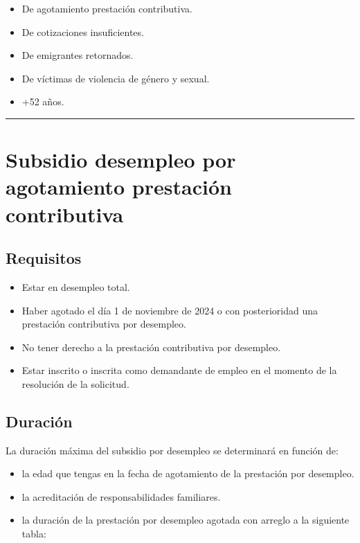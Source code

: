 \documentclass{article}
\begin{document}
	\begin{itemize}
		\item De agotamiento prestación contributiva.
		\item De cotizaciones insuficientes.
		\item De emigrantes retornados.
		\item De víctimas de violencia de género y sexual.
		\item +52 años.
	\end{itemize}
	
	\bigskip
	
	\hrule
	
	\section*{Subsidio desempleo por agotamiento prestación contributiva}
	
	\subsection*{Requisitos}
	
	\begin{itemize}
		\item Estar en desempleo total.
		\item Haber agotado el día 1 de noviembre de 2024 o con posterioridad una prestación contributiva por desempleo.
		\item No tener derecho a la prestación contributiva por desempleo.
		\item Estar inscrito o inscrita como demandante de empleo en el momento de la resolución de la solicitud.
	\end{itemize}
	
	\subsection*{Duración}
	
	La duración máxima del subsidio por desempleo se determinará en función de:
	
	\begin{itemize}
		\item la edad que tengas en la fecha de agotamiento de la prestación por desempleo.
		\item la acreditación de responsabilidades familiares.
		\item la duración de la prestación por desempleo agotada con arreglo a la siguiente tabla:
	\end{itemize}
	
\end{document}
